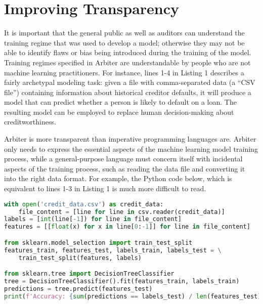 \documentclass[letterpaper]{article}
\begin{document}
\section{Improving Transparency}	
It is important that the general public as well as auditors can understand the training regime that was used to develop a model; otherwise they may not be able to identify flaws or bias being introduced during the training of the model. Training regimes specified in Arbiter are understandable by people who are not machine learning practitioners. For instance, lines 1-4 in  Listing 1 describes a fairly archetypal modeling task: given a file with comma-separated data (a ``CSV file'') containing information about historical creditor defaults, it will produce a model that can predict whether a person is likely to default on a loan. The resulting model can be employed to replace human decision-making about creditworthiness.

Arbiter is more transparent than imperative programming languages are. Arbiter only needs to express the essential aspects of the machine learning model training process, while a general-purpose language must concern itself with incidental aspects of the training process, such as reading the data file and converting it into the right data format. For example, the Python code below, which is equivalent to lines 1-3 in Listing 1 is much more difficult to read.

\begin{lstlisting}[language=Python,caption=Python code equivalent to Listing 1]
with open('credit_data.csv') as credit_data:
    file_content = [line for line in csv.reader(credit_data)]
labels = [int(line[-1]) for line in file_content]
features = [[float(x) for x in line[0:-1]] for line in file_content]

from sklearn.model_selection import train_test_split
features_train, features_test, labels_train, labels_test = \
    train_test_split(features, labels)

from sklearn.tree import DecisionTreeClassifier
tree = DecisionTreeClassifier().fit(features_train, labels_train)
predictions = tree.predict(features_test)
print(f'Accuracy: {sum(predictions == labels_test) / len(features_test)}')
\end{lstlisting}
\end{document}
